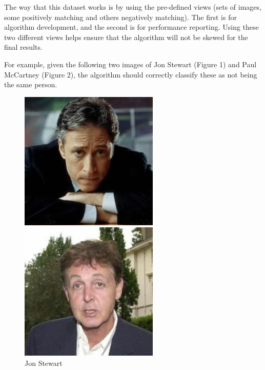 \documentclass[12pt, a4paper]{article}
\begin{document}
The way that this dataset works is by using the pre-defined views (sets of images, some positively matching and others negatively matching). The first is for algorithm development, and the second is for performance reporting. Using these two different views helps ensure that the algorithm will not be skewed for the final results.

For example, given the following two images of Jon Stewart (Figure 1) and  Paul McCartney (Figure 2), the algorithm should correctly classify these as not being the same person. 

\begin{figure}[H]
  \includegraphics[width=\linewidth]{images/Jon_Stewart_0001.jpg}
  \caption{Jon Stewart}
\endminipage\hfill
{}
  \includegraphics[width=\linewidth]{images/Paul_McCartney_0004.jpg}

\end{figure}
\end{document}
